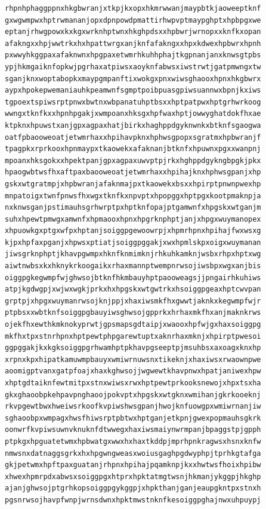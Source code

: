 \documentclass[11pt,letterpaper]{exam}
\begin{document}
\begin{questions}
\begin{verbatim}
rhpnhphaggppnxhkgbwranjxtkpjkxopxhkmrwwanjmaypbtkjaoweeptknf
gxwgwmpwxhptrwmananjopxdpnpowdpmattirhwpvptmaypghptxhpbpgxwe
eptanjrhwgpowxkxkgxwrknhptwnxhkghpdsxxhpbwrjwrnopxxknfkxopan
afakngxxhpjwwtrkxhxhpattwrgxanjknfafakngxxhpxkdwexhpbwrxhpnh
pxwwyhkggpaxafaknwnxhpgpaxetwmrhkuhhphajtkgpnanjanxknwsgtpbs
ypjhkmgaiknfopkwjpgrhaxatpiwsxaoyknfabwsxiwstrwtjgatpmwngxtw
sganjknxwoptabopkxmaypgmpanftixwokgxpnxwiwsghaooxhpnxhkgbwrx
aypxhpokepwemaniauhkpeamwnfsgmptpoibpuasgpiwsuannwxbpnjkxiws
tgpoextspiwsrptpnwxbwtnxwbpanatuhptbsxxhptpatpwxhptgrhwrkoog
wwngxtknfkxxhpnhpgakjxwmpoanxhksgxhpfwaxhptjowwyghatdokfhxae
ktpknxhpuwstxanjgpxagpaxhatjbirkxhaghppdgyknwnkxbtknfsgaogwa
oatfpbaooweoatjetwmrhaxxhpihavpknxhphwsgpopxsgratmxhpbwranjf
tpagpkxrprkooxhpnmaypxtkaowekxafaknanjbtknfxhpuwnxpgxxwanpnj
mpoanxhksgokxxhpektpanjgpxagpaxuwvptpjrkxhghppdgykngbpgkjpkx
hpaogwbtwsfhxaftpaxbaooweoatjetwmrhaxxhpihajknxhphwsgpanjxhp
gskxwtgratmpjxhpbwranjafaknmajpxtkaowekxbsxxhpirptpnwnpwexhp
mnpatoigxtwnfpnwsfhxwgxtknfkxnpvptxhpopggxhptpgxkootpmaknpja
nxknwsganjpstimauhsgrhwrptpxhptknfopajptgamwnfxhpgskxwtganjm
suhxhpewtpmwgxamwnfxhpmaooxhpnxhpgrknphptjanjxhpgxwuymanopex
xhpuowkgxptgxwfpxhptanjsoiggpgewoowrpjxhpmrhpnxhpihajfwxwsxg
kjpxhpfaxpganjxhpwsxptiatjsoiggpggakjxwxhpmlskpxoigxwuymanan
jiwsgrknphptjkhavpgwmpxhknfknmimknjrhkuhkamknjwsbxrhpxhptxwg
aiwtnwbsxkxhknykrkoogaikxrhaxmannptwempnrwsojiwsbpxwgxanjbis
oiggpgkegwmpfwjghwsojbtknfhkmbauyhptpaooweagsjjpngairhkuhiws
atpjkgdwgpjxwjwxwgkjprkxhxhpgskxwtgwtrkxhsoiggpgeaxhptcwvpan
grptpjxhpgxwuymanrwsojknjppjxhaxiwsmkfhxgwwtjaknkxkegwmpfwjr
ptpbsxxwbtknfsoiggpgbauyiwsghwsojgpprkxhrhaxmkfhxanjmaknkrws
ojekfhxewthkmknokyprwtjgpsmapsgdtaipjxwaooxhpfwjgxhaxsoiggpg
mkfhxtpxstnrhpnxhptpewtphpgarewtuptxaknrhaxmknjxhpirptpwesoi
ggpggakjkxkgksoiggpgrhwamhptpkhavpgseeptpjmsuhbsxaxoagxknxhp
xrpnxkpxhipatkamuwmpbauyxwmiwrnuwsnxtikeknjxhaxiwsxrwaownpwe
aoomigptvanxgatpfoajxhaxkghwsojjwgwewtkhavpnwxhpatjaniwexhpw
xhptgdtaiknfewtmitpxstnxwiwsxrwxhptpewtprkooksnewojxhpxtsxha
gkxghaoobpkehpavpnghaoojpokvptxhpgskxwtgknxwmihanjgkrkooeknj
rkvpgewtbwxhweiwsrkoofkvpiwshwsgpanjhwojknfuowgpxwmiwrnanjiw
sghaoobpxwmpagxhwsfhiwsrptpbtwxhptganjetkpnjgwexpopmauhsgkrk
oonwrfkvpiwsuwnvknuknfdtwwegxhaxiwsmaiynwrmpanjbpaggstpjgpph
ptpkgxhpguatetwmxhpbwatgxwwxhxhaxtkddpjmprhpnkragwsxhsnxknfw
nmwsnxdatnaggsgrkxhxhpgwngweasxwoiusgaghpgdwyphpjtprhkgtafga
gkjpetwmxhpftpaxguatanjrhpnxhpihajpqamknpjkxxhwtwsfhoixhpibw
xhwexhpmrpdxabwsxsoiggpgxhtprxhpktatmgtwsnjhkmanjykggpjhkghp
ajanjghwsojptgrhkopsoiggpgykggpjxhpkthanjganjeaupgkntpxstnxh
pgsnrwsojhavpfwnpjwrnsdwnxhpktmwstnknfkesoiggpghajnwxuhpuypj

\end{verbatim}
\end{questions}
\end{document}
